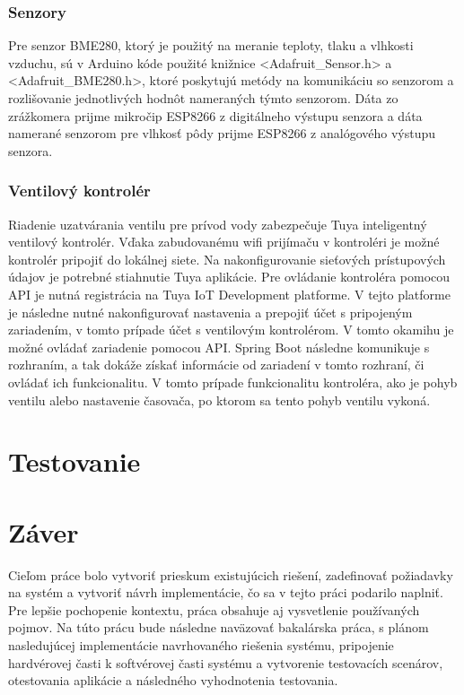 \documentclass[twoside]{ctuthesis}
\theoremstyle{plain}
\theoremstyle{definition}
\theoremstyle{note}
\begin{document}
\subsection{Senzory}
Pre senzor BME280, ktorý je použitý na meranie teploty, tlaku a vlhkosti vzduchu, sú v Arduino kóde použité knižnice  <Adafruit\_Sensor.h> a  <Adafruit\_BME280.h>, ktoré poskytujú metódy na komunikáciu so senzorom a rozlišovanie jednotlivých hodnôt nameraných týmto senzorom. Dáta zo zrážkomera prijme mikročip ESP8266 z digitálneho výstupu senzora a dáta namerané senzorom pre vlhkosť pôdy prijme ESP8266 z analógového výstupu senzora.

\subsection{Ventilový kontrolér}
Riadenie uzatvárania ventilu pre prívod vody zabezpečuje Tuya inteligentný ventilový kontrolér. Vďaka zabudovanému wifi prijímaču v kontroléri je možné kontrolér pripojiť do lokálnej siete. Na nakonfigurovanie sieťových prístupových údajov je potrebné stiahnutie Tuya aplikácie. Pre ovládanie kontroléra pomocou API je nutná registrácia na Tuya IoT Development platforme. V tejto platforme je následne nutné nakonfigurovať nastavenia a prepojiť účet s pripojeným zariadením, v tomto prípade účet s ventilovým kontrolérom. V tomto okamihu je možné ovládať zariadenie pomocou API. Spring Boot následne komunikuje s rozhraním, a tak dokáže získať informácie od zariadení v tomto rozhraní, či ovládať ich funkcionalitu. V tomto prípade funkcionalitu kontroléra, ako je pohyb ventilu alebo nastavenie časovača, po ktorom sa tento pohyb ventilu vykoná.

\chapter{Testovanie}

\chapter{Záver}
Cieľom práce bolo vytvoriť prieskum existujúcich riešení, zadefinovať požiadavky na systém a vytvoriť návrh implementácie, čo sa v tejto práci podarilo naplniť. Pre lepšie  pochopenie kontextu, práca obsahuje aj vysvetlenie používaných pojmov. Na túto prácu bude následne naväzovať bakalárska práca, s plánom nasledujúcej implementácie navrhovaného riešenia systému, pripojenie hardvérovej časti k softvérovej časti systému a vytvorenie testovacích scenárov, otestovania aplikácie a následného vyhodnotenia testovania. 
\end{document}
